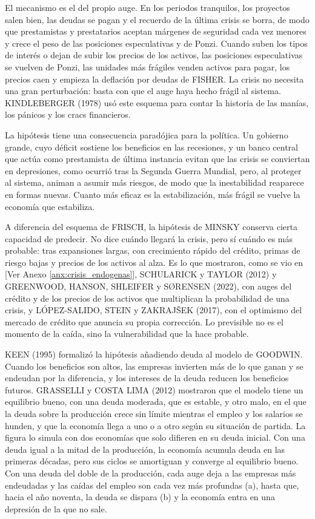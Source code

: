 \documentclass[10pt,a4paper]{article}
\newcommand{\authorfont}[1]{{\fontfamily{EBGaramond-TLF}\selectfont #1}}
\begin{document}
El mecanismo es el del propio auge. En los periodos tranquilos, los proyectos salen bien, las deudas se pagan y el recuerdo de la última crisis se borra, de modo que prestamistas y prestatarios aceptan márgenes de seguridad cada vez menores y crece el peso de las posiciones especulativas y de Ponzi. Cuando suben los tipos de interés o dejan de subir los precios de los activos, las posiciones especulativas se vuelven de Ponzi, las unidades más frágiles venden activos para pagar, los precios caen y empieza la deflación por deudas de FISHER. La crisis no necesita una gran perturbación: basta con que el auge haya hecho frágil al sistema. KINDLEBERGER (1978) usó este esquema para contar la historia de las manías, los pánicos y los cracs financieros.

La hipótesis tiene una consecuencia paradójica para la política. Un gobierno grande, cuyo déficit sostiene los beneficios en las recesiones, y un banco central que actúa como prestamista de última instancia evitan que las crisis se conviertan en depresiones, como ocurrió tras la Segunda Guerra Mundial, pero, al proteger al sistema, animan a asumir más riesgos, de modo que la inestabilidad reaparece en formas nuevas. Cuanto más eficaz es la estabilización, más frágil se vuelve la economía que estabiliza.

A diferencia del esquema de FRISCH, la hipótesis de MINSKY conserva cierta capacidad de predecir. No dice cuándo llegará la crisis, pero sí cuándo es más probable: tras expansiones largas, con crecimiento rápido del crédito, primas de riesgo bajas y precios de los activos al alza. Es lo que mostraron, como se vio en [\authorfont{Ver Anexo \ref{anx:crisis_endogenas}}], SCHULARICK y TAYLOR (2012) y GREENWOOD, HANSON, SHLEIFER y SØRENSEN (2022), con auges del crédito y de los precios de los activos que multiplican la probabilidad de una crisis, y LÓPEZ-SALIDO, STEIN y ZAKRAJŠEK (2017), con el optimismo del mercado de crédito que anuncia su propia corrección. Lo previsible no es el momento de la caída, sino la vulnerabilidad que la hace probable.

KEEN (1995) formalizó la hipótesis añadiendo deuda al modelo de GOODWIN. Cuando los beneficios son altos, las empresas invierten más de lo que ganan y se endeudan por la diferencia, y los intereses de la deuda reducen los beneficios futuros. GRASSELLI y COSTA LIMA (2012) mostraron que el modelo tiene un equilibrio bueno, con una deuda moderada, que es estable, y otro malo, en el que la deuda sobre la producción crece sin límite mientras el empleo y los salarios se hunden, y que la economía llega a uno o a otro según su situación de partida. La figura lo simula con dos economías que solo difieren en su deuda inicial. Con una deuda igual a la mitad de la producción, la economía acumula deuda en las primeras décadas, pero sus ciclos se amortiguan y converge al equilibrio bueno. Con una deuda del doble de la producción, cada auge deja a las empresas más endeudadas y las caídas del empleo son cada vez más profundas (a), hasta que, hacia el año noventa, la deuda se dispara (b) y la economía entra en una depresión de la que no sale.
\end{document}
